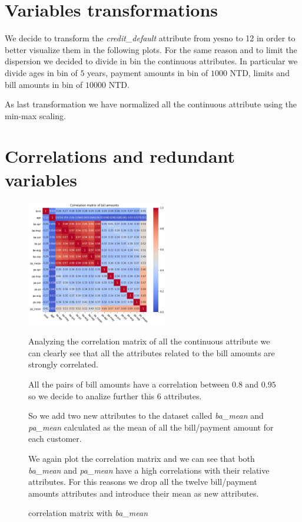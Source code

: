 \section{Variables transformations}

We decide to transform the \textit{credit\_default} attribute from yes\/no to 1\/2 in order to better visualize them in the following plots. For the same reason and to limit the dispersion we decided to divide in bin the continuous attributes. In particular we divide ages in bin of $5$ years, payment amounts in bin of $1000$ NTD, limits and bill amounts in bin of $10000$ NTD.

As last transformation we have normalized all the continuous attribute using the min-max scaling.

\section{Correlations and redundant variables}

\begin{figure}[h]
  \begin{minipage}[h]{.95\textwidth}
  
    \begin{floatingfigure}[r]{0.55\textwidth}
        \mbox{\includegraphics[width=0.55\textwidth]{img/ch2/correlation_matrix_ba}}
        \caption{correlation matrix with \textit{ba\_mean}}
    \end{floatingfigure}

  Analyzing the correlation matrix of all the continuous attribute we can clearly see that all the attributes related to the bill amounts are strongly correlated.

  All the pairs of bill amounts have a correlation between $0.8$ and $0.95$ so we decide to analize further this $6$ attributes.
    
  
  So we add two new attributes to the dataset called \textit{ba\_mean} and \textit{pa\_mean} calculated as the mean of all the bill/payment amount for each customer.
  
  We again plot the correlation matrix and we can see that both \textit{ba\_mean} and \textit{pa\_mean} have a high correlations with their relative attributes. For this reasons we drop all the twelve bill/payment amounts attributes and introduce their mean as new attributes. 


    
  \end{minipage}
\end{figure}
